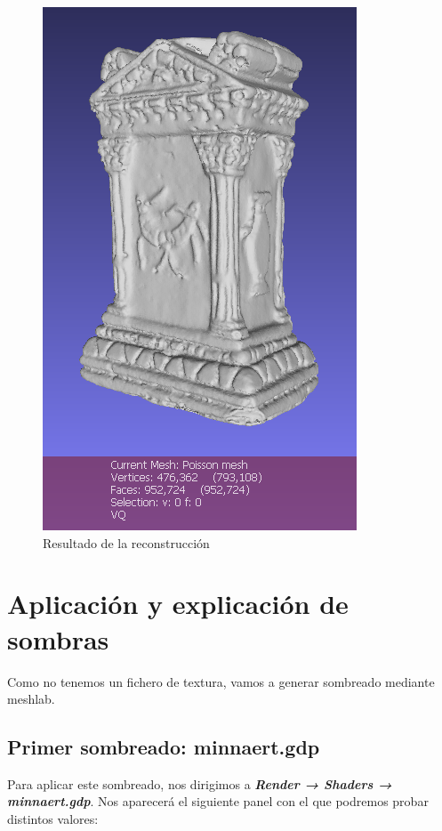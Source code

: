 \documentclass{article}
\begin{document}
\begin{figure}[H]
    \centering
    \includegraphics[scale=0.55]{images/poisson_03.png}
    \caption{Resultado de la reconstrucción}
\end{figure}

\pagebreak

\section{Aplicación y explicación de sombras}

Como no tenemos un fichero de textura, vamos a generar sombreado mediante meshlab.

\subsection{Primer sombreado: minnaert.gdp}

Para aplicar este sombreado, nos dirigimos a \textbf{\textit{Render → Shaders → minnaert.gdp}}. Nos aparecerá el siguiente panel con el que podremos probar distintos valores:
\end{document}
